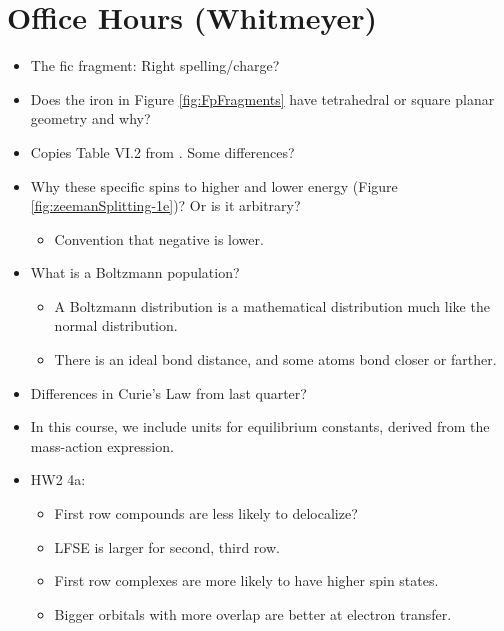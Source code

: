 \documentclass[../notes.tex]{subfiles}
\begin{document}
\section{Office Hours (Whitmeyer)}
\begin{itemize}
    \item {}The fic fragment: Right spelling/charge?
    \item Does the iron in Figure \ref{fig:FpFragments} have tetrahedral or square planar geometry and why?
    \item Copies Table VI.2 from \textcite{bib:CHEM20100Notes}. Some differences?
    \item Why these specific spins to higher and lower energy (Figure \ref{fig:zeemanSplitting-1e})? Or is it arbitrary?
    \begin{itemize}
        \item Convention that negative is lower.
    \end{itemize}
    \item What is a Boltzmann population?
    \begin{itemize}
        \item A Boltzmann distribution is a mathematical distribution much like the normal distribution.
        \item There is an ideal bond distance, and some atoms bond closer or farther.
    \end{itemize}
    \item Differences in Curie's Law from last quarter?
    \item In this course, we include units for equilibrium constants, derived from the mass-action expression.
    \item HW2 4a:
    \begin{itemize}
        \item First row compounds are less likely to delocalize?
        \item LFSE is larger for second, third row.
        \item First row complexes are more likely to have higher spin states.
        \item Bigger orbitals with more overlap are better at electron transfer.
    \end{itemize}
\end{itemize}
\end{document}
